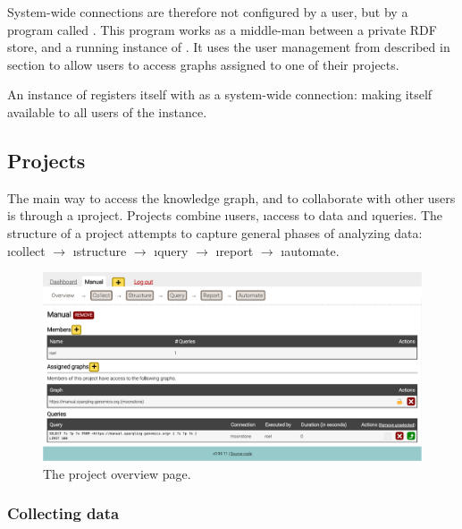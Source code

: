   System-wide connections are therefore not configured by a user, but by a
  program called .  This program works as a middle-man
  between a private RDF store, and a running instance of .  It
  uses the user management from  described in section
   to allow users to access graphs assigned to one
  of their projects.

  An instance of  registers itself with
   as a system-wide connection: making itself available to
  all users of the  instance.

\subsection{Projects}
\label{sec:web-projects}

  The main way to access the knowledge graph, and to collaborate with other
  users is through a \i{project}.  Projects combine \i{users},
  \i{access to data} and \i{queries}.  The structure of a project
  attempts to capture general phases of analyzing data: \i{collect}
  $\rightarrow$ \i{structure} $\rightarrow$ \i{query} $\rightarrow$
  \i{report} $\rightarrow$ \i{automate}.

  \begin{figure}[H]
    \begin{center}
      \includegraphics[width=1.0\textwidth]{figures/sg-web-project-details.pdf}
    \end{center}
    \caption{The project overview page.}
    \label{fig:web-project-overview}
  \end{figure}

\subsubsection{Collecting data}

